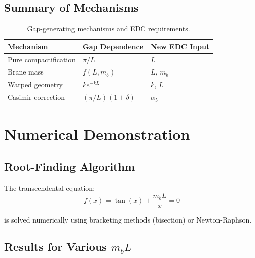 \documentclass[11pt,a4paper]{article}
\newcommand{\mb}{m_b}
\theoremstyle{definition}
\theoremstyle{plain}
\theoremstyle{remark}
\begin{document}
\subsection{Summary of Mechanisms}

\begin{table}[htbp]
\centering
\caption{Gap-generating mechanisms and EDC requirements.}
\label{tab:mechanisms}
\begin{tabular}{@{}lll@{}}
\toprule
Mechanism & Gap Dependence & New EDC Input \\
\midrule
Pure compactification & $\pi/L$ & $L$ \\
Brane mass & $f(L, \mb)$ & $L$, $\mb$ \\
Warped geometry & $k e^{-kL}$ & $k$, $L$ \\
Casimir correction & $(\pi/L)(1 + \delta)$ & $\alpha_5$ \\
\bottomrule
\end{tabular}
\end{table}

\section{Numerical Demonstration}
\label{sec:numerical}

\subsection{Root-Finding Algorithm}

The transcendental equation:
\begin{equation}
f(x) = \tan(x) + \frac{\mb L}{x} = 0
\label{eq:root-finding}
\end{equation}

is solved numerically using bracketing methods (bisection) or Newton-Raphson.

\subsection{Results for Various $\mb L$}
\end{document}

